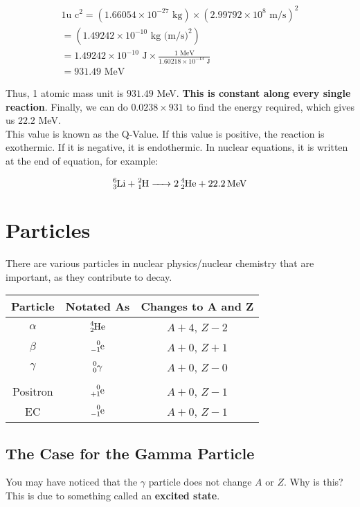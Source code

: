 \documentclass{article}
\begin{document}
\begin{multicols*}{2}
    \begin{equation*}
      \begin{split}
        1 \text{u c}^2 = (1.66054 \times 10^{-27} \text{ kg}) \times (2.99792 \times 10^{8} \text{ m/s})^2\\
        = (1.49242 \times 10^{-10} \text{ kg (m/s)}^2)\\
        = 1.49242 \times 10^{-10} \text{ J} \times
        \frac{1 \text{ MeV}}{1.60218 \times 10^{-13} \text{ J}}\\
        = 931.49 \text{ MeV}
      \end{split}
    \end{equation*}

    Thus, 1 atomic mass unit is $931.49$ MeV. \textbf{This is constant along
    every single reaction}. Finally, we can do $0.0238 \times 931$ to find the
    energy required, which gives us $22.2$ MeV.\\

    This value is known as the Q-Value. If this value is positive, the reaction
    is exothermic. If it is negative, it is endothermic. In nuclear equations,
    it is written at the end of equation, for example:

    \[
      \ce{^6_3Li + ^2_1H -> 2 ^4_2He + 22.2 MeV}
    \]

    \section{Particles}
    There are various particles in nuclear physics/nuclear chemistry that are
    important, as they contribute to decay.\\

    \begin{tabular}{|c|c|c|}
      \hline
      Particle & Notated As & Changes to A and Z \\
      \hline
      $\alpha$ & $\ce{^4_2He}$ & $A+4$, $Z-2$ \\
      $\beta$ & $\ce{^0_-1e}$ & $A+0$, $Z+1$ \\
      $\gamma$ & $\ce{^0_0\gamma}$ & $A+0$, $Z-0$\\
       &  &   \\
      Positron & $\ce{^0_{+1}e}$ & $A+0$, $Z-1$\\
      EC & $\ce{^0_-1e}$ & $A+0$, $Z-1$\\
      \hline
    \end{tabular}

    \subsection{The Case for the Gamma Particle}
    You may have noticed that the $\gamma$ particle does not change $A$ or $Z$.
    Why is this? This is due to something called an \textbf{excited state}.
    

\end{multicols*}
\end{document}
